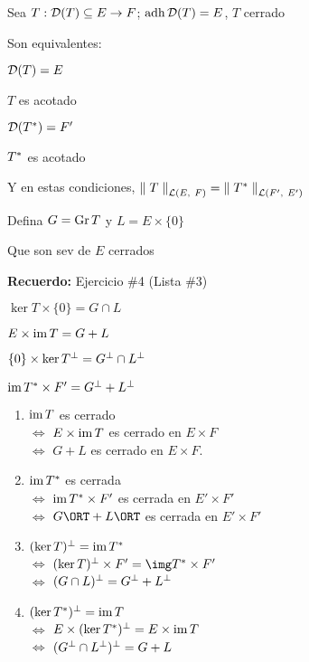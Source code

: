 
\renewcommand{\catnum}{11 (9 No Presencial)}%
\renewcommand{\fecha}{21 de abril de 2020}


\begin{thm}\label{thm:caract-op-acot}
Sea $T: \mathcal{D}(T) \subseteq E \to F$; $\operatorname{\mathop{\text{\upshape{adh}}}} \mathcal{D}(T) = E$, $T$ cerrado

Son equivalentes:
\begin{ienumerate}
    \item $\mathcal{D}(T) = E$
    \item $T$ es acotado
    \item $\mathcal{D}(T^{*}) = F'$
    \item $T^{*}$ es acotado
\end{ienumerate}
Y en estas condiciones, $\norm[\cl(E,\ F)]{T} = \norm[\cl(F',\ E')]{T\adj}$ %
\end{thm}

Defina $G = \operatorname{\mathop{\text{\upshape{Gr}}}} T$ y $L = E \times \{ 0\}$

Que son sev de $E$ cerrados

\textbf{Recuerdo:} Ejercicio \#4 (Lista \#3)

\begin{ienumerate}
    \item $\ker T \times \{ 0\} = G \cap L$
    \item $E \times \operatorname{\mathop{\text{\upshape{im}}}} T = G + L$
    \item $\{ 0 \} \times \ker T^{\perp} = G^{\perp} \cap L^{\perp}$
    \item $\operatorname{\mathop{\text{\upshape{im}}}} T^{*} \times F' = G^{\perp} + L^{\perp}$
\end{ienumerate}

\begin{enumerate}
    \item $\operatorname{\mathop{\text{\upshape{im}}}} T $ es cerrado  \\ 
    $\iff $ $E\times \operatorname{\mathop{\text{\upshape{im}}}} T$ es cerrado en $E \times F$ \\
    $\iff$ $G + L$ es cerrado en $E \times F$.
    \item $\operatorname{\mathop{\text{\upshape{im}}}} T^{*}$ es cerrada \\
    $\iff$ $\operatorname{\mathop{\text{\upshape{im}}}} T^{*} \times F'$ es cerrada en $E' \times F'$ \\
    $\iff$ $G\ORT + L\ORT$ es cerrada en $E' \times F'$ 
    \item $(\ker T )^{\perp} = \operatorname{\mathop{\text{\upshape{im}}}} T^{*}$ \\
    $\iff$ $(\ker T)\ort \times F' = \img T\adj \times F'$ \\ 
    $\iff$ $(G \cap L)^{\perp} = G^{\perp} + L^{\perp}$
    \item $(\ker T^{*})^{\perp} = \operatorname{\mathop{\text{\upshape{im}}}} T$ \\
    $\iff$ $E \times (\ker T ^{*}) ^{\perp} = E \times \operatorname{\mathop{\text{\upshape{im}}}} T$ \\
    $\iff$ $(G^{\perp} \cap L^{\perp}) ^{\perp} = G + L$
\end{enumerate}

